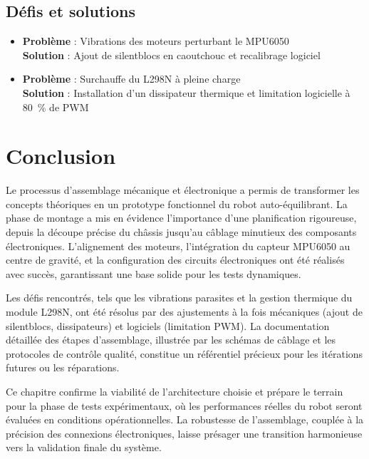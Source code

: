 \documentclass{report}
\begin{document}
\subsection{Défis et solutions}
\label{subsec:defis}

\begin{itemize}
    \item \textbf{Problème} : Vibrations des moteurs perturbant le MPU6050 \\
    \textbf{Solution} : Ajout de silentblocs en caoutchouc et recalibrage logiciel
    
    \item \textbf{Problème} : Surchauffe du L298N à pleine charge \\
    \textbf{Solution} : Installation d’un dissipateur thermique et limitation logicielle à \SI{80}{\%} de PWM
\end{itemize}
\section*{Conclusion }

Le processus d’assemblage mécanique et électronique a permis de transformer les concepts théoriques en un prototype fonctionnel du robot auto-équilibrant. La phase de montage a mis en évidence l’importance d’une planification rigoureuse, depuis la découpe précise du châssis jusqu’au câblage minutieux des composants électroniques. L’alignement des moteurs, l’intégration du capteur MPU6050 au centre de gravité, et la configuration des circuits électroniques ont été réalisés avec succès, garantissant une base solide pour les tests dynamiques. 

Les défis rencontrés, tels que les vibrations parasites et la gestion thermique du module L298N, ont été résolus par des ajustements à la fois mécaniques (ajout de silentblocs, dissipateurs) et logiciels (limitation PWM). La documentation détaillée des étapes d’assemblage, illustrée par les schémas de câblage et les protocoles de contrôle qualité, constitue un référentiel précieux pour les itérations futures ou les réparations. 

Ce chapitre confirme la viabilité de l’architecture choisie et prépare le terrain pour la phase de tests expérimentaux, où les performances réelles du robot seront évaluées en conditions opérationnelles. La robustesse de l’assemblage, couplée à la précision des connexions électroniques, laisse présager une transition harmonieuse vers la validation finale du système.
\end{document}
